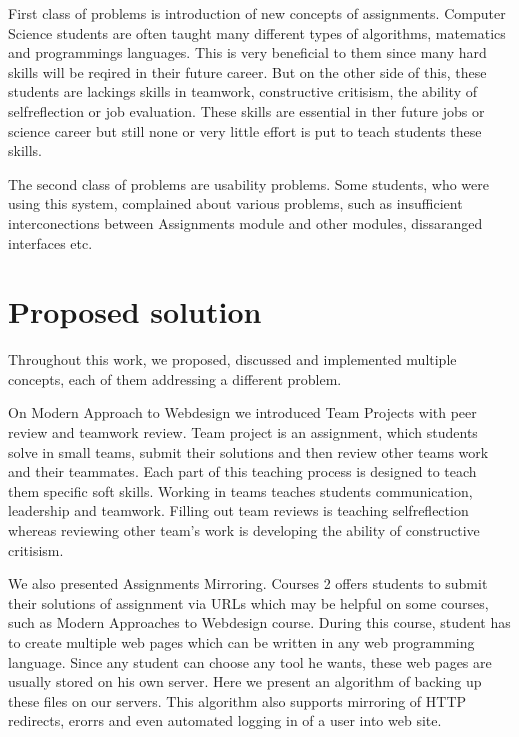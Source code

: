 First class of problems is introduction of new concepts of assignments. Computer Science students are often taught many different types of algorithms, matematics and programmings languages. This is very beneficial to them since many hard skills will be reqired in their future career. But on the other side of this, these students are lackings skills in teamwork, constructive critisism, the ability of self\-reflection or job evaluation.  These skills are essential in ther future jobs or science career but still none or very little effort is put to teach students these skills.

The second class of problems are usability problems. Some students, who were using this system, complained about various problems, such as insufficient interconections between Assignments module and other modules, dissaranged interfaces etc.

\section*{Proposed solution}


Throughout this work, we proposed, discussed and implemented multiple concepts, each of them addressing a different problem.

On Modern Approach to Webdesign we introduced Team Projects with peer review and teamwork review. Team project is an assignment, which students solve in small teams, submit their solutions and then review other teams work and their teammates. Each part of this teaching process is designed to teach them specific soft skills. Working in teams teaches students communication, leadership and teamwork. Filling out team reviews is teaching self\-reflection whereas reviewing other team's work is developing the ability of constructive critisism.


We also presented Assignments Mirroring. Courses 2 offers students to submit their solutions of assignment via URLs which may be helpful on some courses, such as Modern Approaches to Webdesign course. During this course, student has to create multiple web pages which can be written in any web programming language. Since any student can choose any tool he wants, these web pages are usually stored on his own server. Here we present an algorithm of backing up these files on our servers. This algorithm also supports mirroring of HTTP redirects, erorrs and even automated logging in of a user into web site.

